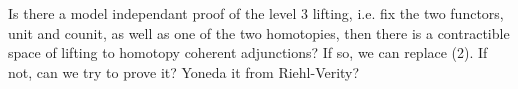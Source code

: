 Is there a model independant proof of the level 3 lifting,
i.e. fix the two functors, unit and counit, as well as one of the
two homotopies, then there is a contractible space of lifting to
homotopy coherent adjunctions?
If so, we can replace (2).
If not, can we try to prove it? Yoneda it from Riehl-Verity?
